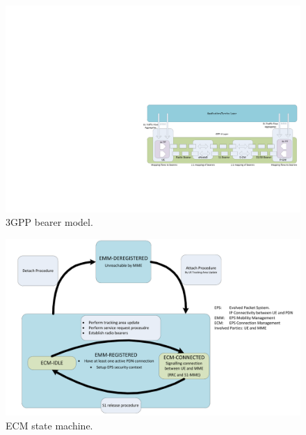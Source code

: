 \begin{figure}[htbp]
	\centering
	\includegraphics[width=1.2\textwidth]{images/bearers.pdf}
	\caption{3GPP bearer model.}
	\label{c4:fig:3gpp-bearers}
\end{figure}


\begin{figure}[htbp]
	\centering
	\includegraphics[width=1.2\textwidth]{images/ECM-states.pdf}
	\caption{\ac{ECM} state machine.}
	\label{c4:fig:3gpp-ecmstates}
\end{figure}

